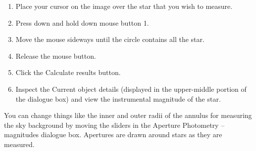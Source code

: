 \documentclass[twoside,11pt]{starlink}
\begin{document}
\begin{enumerate}
\begin{enumerate}
     \item Place your cursor on the image over the star that you wish
      to measure.

     \item Press down and hold down mouse button 1.

     \item Move the mouse sideways until the circle contains all the star.

     \item Release the mouse button.

     \item Click the \textsf{Calculate results} button.

     \item Inspect the \textsf{Current object details} (displayed in the
      upper-middle portion of the dialogue box) and view the instrumental
      magnitude of the star.

  \end{enumerate}

   You can change things like the inner and outer radii of the annulus for
   measuring the sky background by moving the sliders in the \textsf{Aperture
   Photometry -- magnitudes} dialogue box.  Apertures are drawn around
   stars as they are measured.


\end{enumerate}
\end{document}
